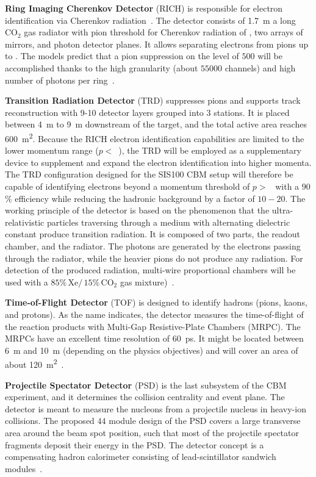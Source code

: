 \textbf{Ring Imaging Cherenkov Detector} (\gls{RICH}) is responsible for electron identification via Cherenkov radiation~\cite{RICH}. The detector consists of \SI{1.7}{\metre} a long $\mathrm{CO_{2}}$ gas radiator with pion threshold for Cherenkov radiation of , two arrays of mirrors, and photon detector planes. It allows separating electrons from pions up to . The models predict that a pion suppression on the level of $500$ will be accomplished thanks to the high granularity (about $55000$ channels) and high number of photons per ring~\cite{RICH}.\bigbreak

\textbf{Transition Radiation Detector} (\gls{TRD}) suppresses pions and  supports track reconstruction with 9-10 detector layers grouped into $3$ stations. It is placed between \SI{4}{\metre} to \SI{9}{\metre} downstream of the target, and the total active area reaches \SI{600}{\square\metre}. Because the RICH electron identification capabilities are limited to the lower momentum range ($p < $~), the TRD will be employed as a supplementary device to supplement and expand the electron identification into higher momenta. The TRD configuration designed for the SIS100 CBM setup will therefore be capable of identifying electrons beyond a momentum threshold of $p > $~ with a $90$\% efficiency while reducing the hadronic background by a factor of $10 - 20$. The working principle of the detector is based on the phenomenon that the ultra-relativistic particles traversing through a medium with alternating dielectric constant produce transition radiation. It is composed of two parts, the readout chamber, and the radiator. The photons are generated by the electrons passing through the radiator, while the heavier pions do not produce any radiation. For detection of the produced radiation, multi-wire proportional chambers will be used with a $85\%\,\mathrm{Xe}/\,15\%\,\mathrm{CO_{2}}$ gas mixture)~\cite{TRD}. \bigbreak

\textbf{Time-of-Flight Detector} (\gls{TOF}) is designed to identify hadrons (pions, kaons, and protons). As the name indicates, the detector measures the time-of-flight of the reaction products with Multi-Gap Resistive-Plate Chambers (\gls{MRPC}). The \glspl{MRPC} have an excellent time resolution of \SI{60}{\pico\second}.  It might be located between \SI{6}{\metre} and \SI{10}{\metre} (depending on the physics objectives) and will cover an area of about \SI{120}{\square\metre}~\cite{TOF}. \bigbreak

\textbf{Projectile Spectator Detector} (\gls{PSD}) is the last subsystem of the \gls{CBM} experiment, and it determines the collision centrality and event plane. The detector is meant to measure the nucleons from a projectile nucleus in heavy-ion collisions. The proposed $44$ module design of the PSD covers a large transverse area around the beam spot position, such that most of the projectile spectator fragments deposit their energy in the \gls{PSD}. The detector concept is a compensating hadron calorimeter consisting of lead-scintillator sandwich modules~\cite{PSD}.\bigbreak


